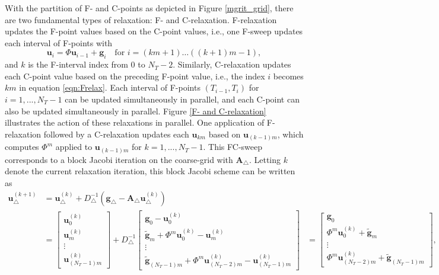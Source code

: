 \documentclass[VANCOUVER,STIX1COL]{WileyNJD-v2}
\begin{document}
With the partition of F- and C-points as depicted in Figure \ref{mgrit_grid}, there are two fundamental types of relaxation: F- and C-relaxation. F-relaxation updates the F-point values based on the C-point values, i.e., one F-sweep updates each interval of F-points with 
\begin{equation}
 \mathbf{u}_i = \Phi \mathbf{u}_{i-1} + \mathbf{g}_i \quad \mbox{for } i = (km+1) \dots ((k+1)m-1),
 \label{eqn:Frelax}
 \end{equation}
and $k$ is the F-interval index from $0$ to $N_T-2$.
Similarly, C-relaxation updates each C-point value based on the preceding F-point value, i.e., the index $i$ becomes $km$ in equation \eqref{eqn:Frelax}. Each interval of F-points $(T_{i-1}, T_{i})$ for $i = 1,..., N_T-1$ can be updated simultaneously in parallel, and each C-point can also be updated simultaneously in parallel. Figure \ref{F- and C-relaxation} illustrates the action of these relaxations in parallel.
One application of F-relaxation followed by a C-relaxation updates each $\mathbf{u}_{km}$ based on $\mathbf{u}_{(k-1)m}$, which computes $\Phi^m$ applied to $\mathbf{u}_{(k-1)m}$ for $k = 1,..., N_T-1$. This FC-sweep corresponds to a block Jacobi iteration on the coarse-grid with $\mathbf{A}_{\triangle}$. Letting $k$ denote the current relaxation iteration, this block Jacobi scheme can be written as
\begin{equation} \label{block jacobi F- and C- relaxation}
\begin{aligned}
{\mathbf{u}_{\triangle}^{(k + 1)}} & {= \mathbf{u}^{(k)}_{\triangle} + D_\triangle^{-1} (\mathbf{g}_{\triangle} - \mathbf{A}_{\triangle} \mathbf{u}^{(k)}_{\triangle})} \\
&= \begin{bmatrix} \mathbf{u}_0^{(k)}\\ \mathbf{u}_m^{(k)} 
\\ \vdots \\ \mathbf{u}_{(N_T-1) m}^{(k)} \end{bmatrix} + D_\triangle^{-1} 
\begin{bmatrix}
\mathbf{g}_0 - \mathbf{u}_0^{(k)} \\ \tilde{\mathbf{g}}_m + \Phi^m \mathbf{u}_0^{(k)} - \mathbf{u}_m^{(k)} \\ \vdots \\ \tilde{\mathbf{g}}_{(N_T-1) m} + \Phi^m \mathbf{u}_{(N_T - 2)m}^{(k)} - \mathbf{u}_{(N_T-1) m}^{(k)}
\end{bmatrix}
&= \begin{bmatrix} \mathbf{g}_0 \\ \Phi^m \mathbf{u}_0^{(k)} + \tilde{\mathbf{g}}_m \\ \vdots \\ \Phi^m \mathbf{u}_{(N_T - 2)m}^{(k)} + \tilde{\mathbf{g}}_{(N_T-1) m}\end{bmatrix},
\end{aligned}
\end{equation}
\end{document}
